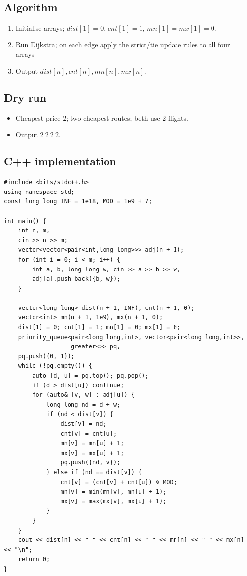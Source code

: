 \subsection*{Algorithm}

\begin{enumerate}
  \item Initialise arrays; $\textit{dist}[1]=0$, $\textit{cnt}[1]=1$,
        $\textit{mn}[1]=\textit{mx}[1]=0$.
  \item Run Dijkstra; on each edge apply the strict/tie update rules to all
        four arrays.
  \item Output $\textit{dist}[n],\textit{cnt}[n],\textit{mn}[n],
        \textit{mx}[n]$.
\end{enumerate}

\subsection*{Dry run}


\begin{itemize}
  \item Cheapest price $2$; two cheapest routes; both use $2$ flights.
  \item Output $2\ 2\ 2\ 2$.
\end{itemize}

\subsection*{C++ implementation}

\begin{lstlisting}
#include <bits/stdc++.h>
using namespace std;
const long long INF = 1e18, MOD = 1e9 + 7;

int main() {
    int n, m;
    cin >> n >> m;
    vector<vector<pair<int,long long>>> adj(n + 1);
    for (int i = 0; i < m; i++) {
        int a, b; long long w; cin >> a >> b >> w;
        adj[a].push_back({b, w});
    }

    vector<long long> dist(n + 1, INF), cnt(n + 1, 0);
    vector<int> mn(n + 1, 1e9), mx(n + 1, 0);
    dist[1] = 0; cnt[1] = 1; mn[1] = 0; mx[1] = 0;
    priority_queue<pair<long long,int>, vector<pair<long long,int>>,
                   greater<>> pq;
    pq.push({0, 1});
    while (!pq.empty()) {
        auto [d, u] = pq.top(); pq.pop();
        if (d > dist[u]) continue;
        for (auto& [v, w] : adj[u]) {
            long long nd = d + w;
            if (nd < dist[v]) {
                dist[v] = nd;
                cnt[v] = cnt[u];
                mn[v] = mn[u] + 1;
                mx[v] = mx[u] + 1;
                pq.push({nd, v});
            } else if (nd == dist[v]) {
                cnt[v] = (cnt[v] + cnt[u]) % MOD;
                mn[v] = min(mn[v], mn[u] + 1);
                mx[v] = max(mx[v], mx[u] + 1);
            }
        }
    }
    cout << dist[n] << " " << cnt[n] << " " << mn[n] << " " << mx[n] << "\n";
    return 0;
}
\end{lstlisting}

